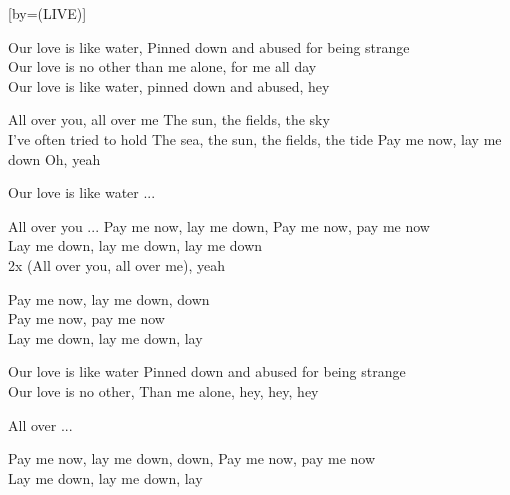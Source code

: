  


[by={(LIVE)}]



\beginverse
Our love is like water,	\brk Pinned down and abused for being strange	\\
Our love is no other than me alone, for me all day	\\
Our love is like water, pinned down and abused, hey	\\
\endverse

\beginchorus
All over you, all over me	\brk The sun, the fields, the sky	\\
I've often tried to hold	\brk The sea, the sun, the fields, the tide	
Pay me now, lay me down	\brk Oh, yeah	\\
\endchorus

\beginverse
Our love is like water ...
\endverse

\beginchorus
All over you ...
Pay me now, lay me down, \brk Pay me now, pay me now	\\
Lay me down, lay me down, lay me down	\\
2x (All over you, all over me), yeah	\\
\endchorus

\beginchorus
Pay me now, lay me down, down	\\
Pay me now, pay me now	\\
Lay me down, lay me down, lay	\\
\endchorus

\beginverse
Our love is like water	\brk Pinned down and abused for being strange	\\
Our love is no other,	\brk Than me alone, hey, hey, hey	\\
\endverse

\beginchorus
All over ...
\endchorus

\beginchorus
Pay me now, lay me down, down,	\brk Pay me now, pay me now	\\
Lay me down, lay me down, lay	
\endchorus


\endsong
